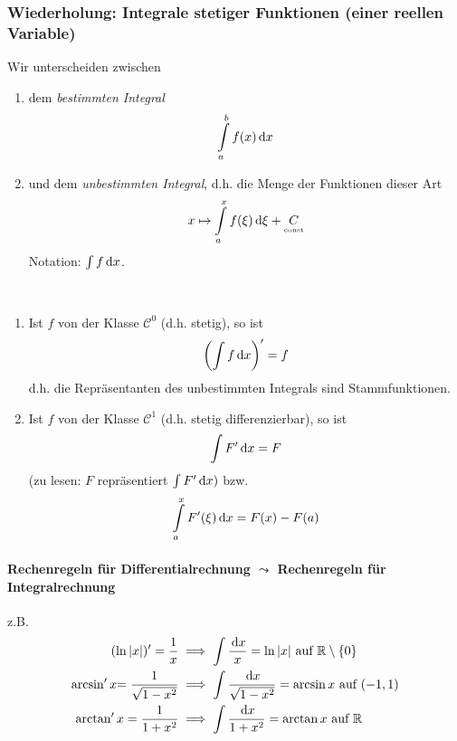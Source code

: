 \newpage
\appendix
\subsubsection*{Wiederholung: Integrale stetiger Funktionen (einer reellen Variable)} %
Wir unterscheiden zwischen
\begin{enumerate}[- ,topsep =-3pt]
	\item dem \emph{bestimmten Integral}
				$$ \int\limits_a^b f(x)\, \mathrm{d} x$$
	\item und dem \emph{unbestimmten Integral}, d.h. die Menge der Funktionen dieser Art
	$$x \mapsto \int\limits_a^x f(\xi) \, \mathrm{d} \xi + \underset{\text{\tiny const}}C$$
	Notation: $\int f \, \mathrm{d} x$.
\end{enumerate}

\begin{satz}  \begin{mdframed} \
\begin{enumerate}[(\roman*), topsep = -1 pt]
	\item Ist $f$ von der Klasse $\mathcal{C}^0$ (d.h. stetig), so ist 
		$$\left(\int f \, \mathrm{d} x\right)' = f$$
		d.h. die Repräsentanten des unbestimmten Integrals sind Stammfunktionen.
	\item Ist $f$ von der Klasse $\mathcal{C}^1$ (d.h. stetig differenzierbar), so ist
	$$ \int F' \, \mathrm{d} x =F$$
	(zu lesen: $F$ repräsentiert $\int F' \, \mathrm{d} x)$ bzw.
	$$ \int\limits_a^x F'(\xi) \, \mathrm{d} x = F(x) -F(a)$$
\end{enumerate}
\end{mdframed}
\end{satz}

\paragraph{Rechenregeln für Differentialrechnung $\leadsto$ Rechenregeln für Integralrechnung}z.B.
\begin{equation*}
	\begin{split}
		(\ln |x|)' = \frac{1}{x} & \implies \int \frac{\, \mathrm{d} x}{x} = \ln |x| \text{ auf } \mathbb{R}\setminus\{0\}\\
		\arcsin' x {=\frac{1}{\sqrt{1-x^2}}} & \implies \int \frac{\, \mathrm{d} x}{\sqrt{1-x^2}} = \arcsin x \text{ auf } (-1,1) \\ 		
		\arctan' x = \frac{1}{1+x^2} & \implies \int \frac{\, \mathrm{d} x}{1+x^2} = \arctan x \text{ auf }\mathbb{R}
	\end{split}
\end{equation*}
